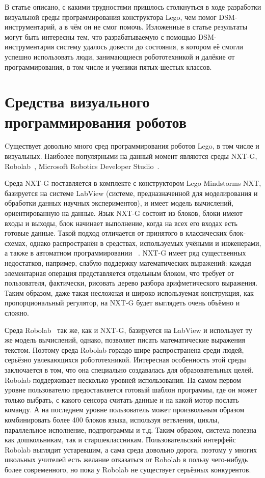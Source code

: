 \documentclass[a4paper]{article}
\begin{document}
В статье описано, с какими трудностями пришлось столкнуться в ходе разработки визуальной среды программирования конструктора Lego, чем помог DSM-инструментарий, а в чём он не смог помочь. Изложенные в статье результаты могут быть интересны тем, что разрабатываемую с помощью DSM-инструментария систему удалось довести до состояния, в котором её смогли успешно использовать люди, занимающиеся робототехникой и далёкие от программирования, в том числе и ученики пятых-шестых классов. 

\section{Средства визуального программирования роботов}
Cуществует довольно много сред программирования роботов Lego, в том числе и визуальных. Наиболее популярными на данный момент являются среды NXT-G, Robolab~\cite{robolab}, Microsoft Robotics Developer Studio~\cite{mrds}.

Среда NXT-G поставляется в комплекте с конструктором Lego Mindstorms NXT, базируется на системе LabView (системе, предназначенной для моделирования и обработки данных научных экспериментов), и имеет модель вычислений, ориентированную на данные. Язык NXT-G  состоит из блоков, блоки имеют входы и выходы, блок начинает выполнение, когда на всех его входах есть готовые данные. Такой подход отличается от принятого в классических блок-схемах, однако распространён в средствах, используемых учёными и инженерами, а также в автоматном программировании ~\cite{shalito1, shalito2}.  NXT-G имеет ряд существенных недостатков, например, слабую поддержку математических выражений: каждая элементарная операция представляется отдельным блоком, что требует от пользователя, фактически, рисовать дерево разбора арифметического выражения. Таким образом, даже такая несложная и широко используемая конструкция, как пропорциональный регулятор, на NXT-G будет выглядеть очень объёмно и сложно.

Среда Robolab~\cite{robolab} так же, как и NXT-G, базируется на LabView и использует ту же модель вычислений, однако, позволяет писать математические выражения текстом. Поэтому среда Robolab гораздо шире распространена среди людей, серьёзно увлекающихся робототехникой. Интересная особенность этой среды заключается в том, что она специально создавалась для образовательных целей. Robolab  поддерживает несколько уровней использования. На самом первом уровне пользователю предоставляется готовый шаблон программы, где он может только выбрать, с какого сенсора считать данные и на какой мотор послать команду. А на последнем уровне пользователь может произвольным образом комбинировать более 400 блоков языка, используя ветвления, циклы, параллельное исполнение, подпрограммы и т.д. Таким образом, система полезна как дошкольникам, так и старшеклассникам. Пользовательский интерфейс Robolab выглядит устаревшим, а сама среда довольно дорога, поэтому у многих школьных учителей есть желание отказаться от Robolab в пользу чего-нибудь более современного, но пока у Robolab не существует серьёзных конкурентов.
\end{document}

